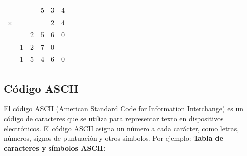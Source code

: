 \documentclass{templateNote}
\begin{document}
\begin{tcolorbox}[colback=blue!10, colframe=blue!80!black, title={Ejemplo}]
\begin{center}
    \begin{tabular}{c@{}c@{}c@{}c@{}c@{}c}
        & & & 5 & 3 & 4  \\ %
        $\times$ & & & & 2 & 4   \\ %
        \hline
        & & 2& 5 & 6& 0\\ %
        + & 1 & 2 & 7 & 0 & \\ %
        \hline
        & 1  & 5 & 4 & 6 & 0 %
    \end{tabular}
\end{center}
\end{tcolorbox}

\subsection{Código ASCII}
\noindent El código ASCII (American Standard Code for Information Interchange) es un código de caracteres que se utiliza para representar texto en dispositivos electrónicos. El código ASCII asigna un número a cada carácter, como letras, números, signos de puntuación y otros símbolos. Por ejemplo:
\textbf{Tabla de caracteres y símbolos ASCII:}
\end{document}
